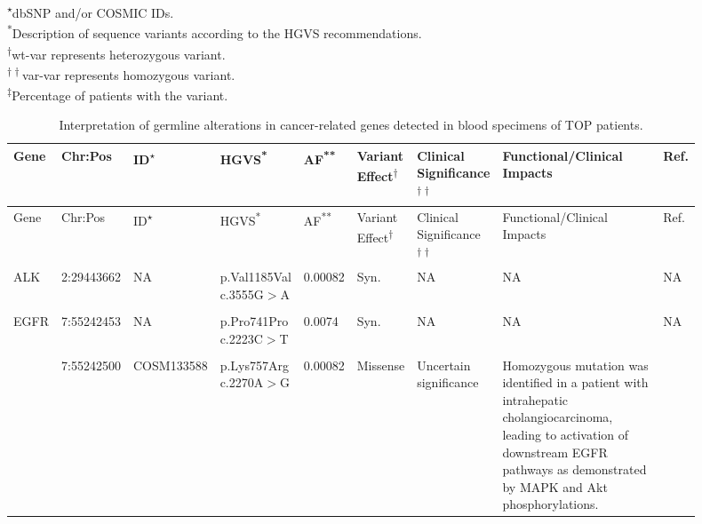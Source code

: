 \noindent\textsuperscript{$\star$}dbSNP and/or COSMIC IDs.
\\
\textsuperscript{*}Description of sequence variants according to the HGVS recommendations.
\\
\textsuperscript{$\dagger$}wt-var represents heterozygous variant.
\\
\textsuperscript{$\dagger\dagger$}var-var represents homozygous variant.
\\\textsuperscript{$\ddagger$}Percentage of patients with the variant.



\begin{landscape}

\begin{longtable}{p{0.07\linewidth}|p{0.09\linewidth}p{0.11\linewidth}p{0.1\linewidth}p{0.05\linewidth}p{0.065\linewidth}p{0.11\linewidth}p{0.25\linewidth}p{0.05\linewidth}}
		\caption{Interpretation of germline alterations in cancer-related genes detected in blood specimens of TOP patients.}
    \label{tbl:germline_cancer_genes}
		\\
    \hline
    Gene & Chr:Pos & ID\textsuperscript{$\star$} & HGVS\textsuperscript{*} & AF\textsuperscript{**} & Variant Effect\textsuperscript{$\dagger$} & Clinical Significance\textsuperscript{$\dagger\dagger$} & Functional/Clinical Impacts & Ref.
		\\
    \hline
    \endfirsthead
    \hline
    Gene & Chr:Pos & ID\textsuperscript{$\star$} & HGVS\textsuperscript{*} & AF\textsuperscript{**} & Variant Effect\textsuperscript{$\dagger$} & Clinical Significance\textsuperscript{$\dagger\dagger$} & Functional/Clinical Impacts & Ref.
		\\
    \hline
    \endhead
		ALK & 2:29443662 & NA & p.Val1185Val c.3555G$>$A & 0.00082 & Syn. & NA & NA & NA
		\\
		\\
		\hline
		EGFR & 7:55242453 & NA & p.Pro741Pro c.2223C$>$T & 0.0074 & Syn. & NA & NA & NA
		\\
		\\
		& 7:55242500 & COSM133588 & p.Lys757Arg c.2270A$>$G & 0.00082 & Missense & Uncertain \mbox{significance} & Homozygous mutation was identified in a patient with intrahepatic cholangiocarcinoma, leading to activation of downstream EGFR pathways as demonstrated by MAPK and Akt phosphorylations. & \cite{Leone2006}
		\\

\end{longtable}
\end{landscape}
